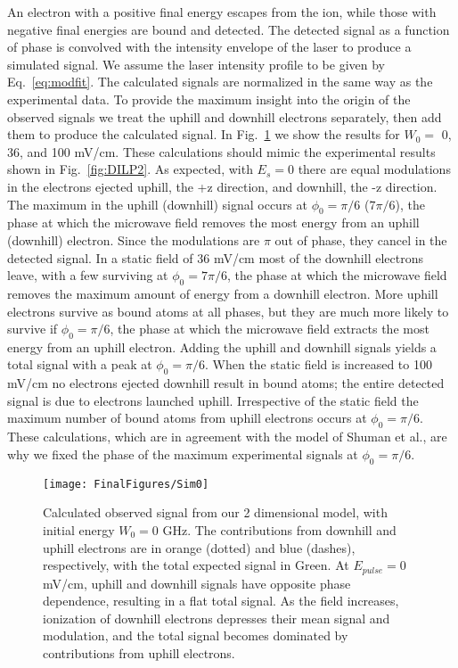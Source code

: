 \documentclass[aps,pra,preprint,groupedaddress]{revtex4-1}
\begin{document}
An electron with a positive final energy escapes from the ion, while those with negative final energies are bound and detected. The detected signal as a function of phase is convolved with the intensity envelope of the laser to produce a simulated signal. We assume the laser intensity profile to be given by Eq.~\ref{eq:modfit}. The calculated signals are normalized in the same way as the experimental data. To provide the maximum insight into the origin of the observed signals we treat the uphill and downhill electrons separately, then add them to produce the calculated signal. 
In Fig.~\ref{fig:2DW0} we show the results for $W_0 =$ 0, 36, and 100 mV/cm. These calculations should mimic the experimental results shown in Fig.~\ref{fig:DILP2}. As expected, with $E_s=0$ there are equal modulations in the electrons ejected uphill, the +z direction, and downhill, the -z direction. The maximum in the uphill (downhill) signal occurs at $\phi_0=\pi/6$ ($7\pi/6$), the phase at which the microwave field removes the most energy from an uphill (downhill) electron. Since the modulations are $\pi$ out of phase, they cancel in the detected signal. In a static field of 36 mV/cm most of the downhill electrons leave, with a few surviving at $\phi_0=7\pi/6$, the phase at which the microwave field removes the maximum amount of energy from a downhill electron. More uphill electrons survive as bound atoms at all phases, but they are much more likely to survive if $\phi_0=\pi/6$, the phase at which the microwave field extracts the most energy from an uphill electron. Adding the uphill and downhill signals yields a total signal with a peak at $\phi_0=\pi/6$. When the static field is increased to 100 mV/cm no electrons ejected downhill result in bound atoms; the entire detected signal is due to electrons launched uphill. Irrespective of the static field the maximum number of bound atoms from uphill electrons occurs at $\phi_0=\pi/6$. These calculations, which are in agreement with the model of Shuman et al., are why we fixed the phase of the maximum experimental signals at $\phi_0=\pi/6$.

\begin{figure}
	\texttt{[image: FinalFigures/Sim0]}
	\caption{Calculated observed signal from our 2 dimensional model, with initial energy $W_0 = 0$ GHz. The contributions from downhill and uphill electrons are in orange (dotted) and blue (dashes), respectively, with the total expected signal in Green. At $E_{pulse} = 0$ mV/cm, uphill and downhill signals have opposite phase dependence, resulting in a flat total signal. As the field increases, ionization of downhill electrons depresses their mean signal and modulation, and the total signal becomes dominated by contributions from uphill electrons.}
	\label{fig:2DW0}
\end{figure}
\end{document}
